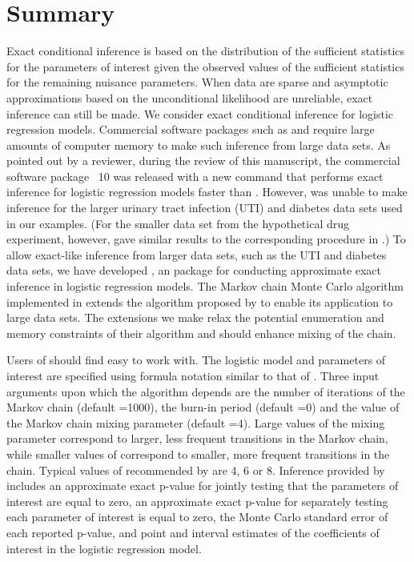\documentclass[article, shortnames]{jss}
\begin{document}
\section{Summary} \label{Summary}

Exact conditional inference is based on the distribution of the
sufficient statistics for the parameters of interest given the
observed values of the sufficient statistics for the remaining
nuisance parameters. When data are sparse and asymptotic
approximations based on the unconditional likelihood are
unreliable, exact inference can still be made. We consider exact
conditional inference for logistic regression models.  Commercial
software packages such as  and  require
large amounts of computer memory to make such inference from large
data sets.
As pointed out by a reviewer, during the review of this
manuscript, the commercial software package ~10 was
released with a new command  that performs exact
inference for logistic regression models faster than
. However,  was unable to make
inference for the larger urinary tract infection (UTI) and
diabetes data sets used in our examples. (For the smaller data set
from the hypothetical drug experiment, however, 
gave similar results to the corresponding procedure in
.) To allow exact-like inference from larger data
sets, such as the UTI and diabetes data sets, we have
developed , an  package for
conducting approximate exact inference in logistic regression
models.
The Markov chain Monte Carlo algorithm implemented in
 extends the algorithm proposed by \citet{Forster:2003}
to enable its application to large data sets. The extensions we
make relax the potential enumeration and memory constraints of
their algorithm and should enhance mixing of the chain.

Users of  should find  easy to work with. The
logistic model and parameters of interest are specified using
 formula notation similar to that of . Three
input arguments upon which the  algorithm depends are
the number of iterations of the Markov chain (default =1000),
the burn-in period (default =0) and the
value of the Markov chain mixing parameter (default =4).
Large values of the mixing parameter  correspond to larger,
less frequent transitions in the Markov chain, while smaller values of
 correspond to smaller, more frequent transitions in the
chain. Typical values of  recommended by \citet{Forster:2003}
are 4, 6 or 8. Inference
provided by  includes an approximate exact p-value for
jointly testing that the parameters of interest are equal to zero,
an approximate exact p-value for separately testing each parameter
of interest is equal to zero, the Monte Carlo standard error of
each reported p-value, and point and interval estimates of the
coefficients of interest in the logistic regression model.
\end{document}
